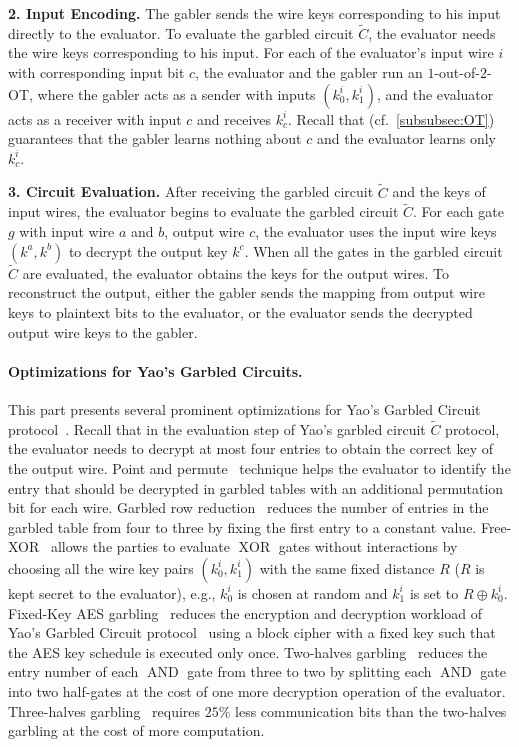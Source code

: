 \textbf{2. Input Encoding.}
The gabler sends the wire keys corresponding to his input directly to the evaluator. To evaluate the garbled circuit $\widetilde{C}$, the evaluator needs the wire keys corresponding to his input. For each of the evaluator's input wire $i$ with corresponding input bit $c$, the evaluator and the gabler run an $1$-out-of-$2$-OT, where the gabler acts as a sender with inputs $\left(k_0^i,k_1^i\right)$, and the evaluator acts as a receiver with input $c$ and receives $k_c^i$. Recall that \ot (cf.~\autoref{subsubsec:OT}) guarantees that the gabler learns nothing about $c$ and the evaluator learns only $k_{c}^i$.

\textbf{3. Circuit Evaluation.}
After receiving the garbled circuit $\widetilde{C}$ and the keys of input wires, the evaluator begins to evaluate the garbled circuit $\widetilde{C}$. For each gate $g$ with input wire $a$ and $b$, output wire $c$, the evaluator uses the input wire keys $\left(k^a,k^b\right)$ to decrypt the output key $k^c$. When all the gates in the garbled circuit $\widetilde{C}$ are evaluated, the evaluator obtains the keys for the output wires. To reconstruct the output, either the gabler sends the mapping from output wire keys to plaintext bits to the evaluator, or the evaluator sends the decrypted output wire keys to the gabler.


\paragraph{Optimizations for Yao's Garbled Circuits.}
\label{para:OptimizationsforYaosGarbledCircuits}
This part presents several prominent optimizations for Yao's Garbled Circuit protocol~\cite{yao1986generate}.
Recall that in the evaluation step of Yao's garbled circuit $\widetilde{C}$ protocol, the evaluator needs to decrypt at most four entries to obtain the correct key of the output wire. Point and permute~\cite{beaver1990round} technique helps the evaluator to identify the entry that should be decrypted in garbled tables with an additional permutation bit for each wire.
Garbled row reduction~\cite{naor1999privacy} reduces the number of entries in the garbled table from four to three by fixing the first entry to a constant value.
Free-XOR~\cite{kolesnikov2008improved} allows the parties to evaluate $\operatorname{XOR}$ gates without interactions by choosing all the wire key pairs $\left(k_0^i,k_1^i\right)$ with the same fixed distance $R$ ($R$ is kept secret to the evaluator), e.g., $k_0^i$ is chosen at random and $ k_1^i $ is set to $R\oplus k_0^i $.
Fixed-Key AES garbling~\cite{bellare2013efficient} reduces the encryption and decryption workload of Yao's Garbled Circuit protocol~\cite{yao1986generate} using a block cipher with a fixed key such that the AES key schedule is executed only once.
Two-halves garbling~\cite{zahur2015two} reduces the entry number of each $\operatorname{AND}$ gate from three to two by splitting each $\operatorname{AND}$ gate into two half-gates at the cost of one more decryption operation of the evaluator.
Three-halves garbling~\cite{rosulek2021three} requires $25\%$ less communication bits than the two-halves garbling at the cost of more computation.

